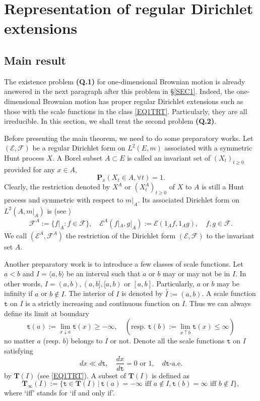 \documentclass[a4paper]{amsart}
\theoremstyle{definition}
\theoremstyle{remark}
\numberwithin{equation}{section}
\begin{document}
\section{Representation of regular Dirichlet extensions}\label{SEC2}

\subsection{Main result}\label{SEC21}
The existence problem \textbf{(Q.1)} for one-dimensional Brownian motion is already answered in the next paragraph after this problem in \S\ref{SEC1}. Indeed, the one-dimensional Brownian motion has proper regular Dirichlet extensions such as those with the scale functions in the class \eqref{EQ1TRT}. Particularly, they are all irreducible. In this section, we shall treat the second problem \textbf{(Q.2)}.

Before presenting the main theorem, we need to do some preparatory works. Let $({{\mathcal{E}}},{{\mathcal{F}}})$ be a regular Dirichlet form on $L^2(E,m)$ associated with a symmetric Hunt process $X$. A Borel subset $A\subset E$ is called an invariant set of $(X_t)_{t\geq 0}$ provided for any $x\in A$,
\[
\mathbf{P}_x(X_t\in A, \forall t)=1.
\]
Clearly, the restriction denoted by $X^A$ or $(X^A_t)_{t\geq 0}$ of $X$ to $A$ is still a Hunt process and symmetric with respect to $m|_A$. Its associated Dirichlet form on $L^2(A, m|_A)$ is (see \cite[\S2.1]{CF12})
\[
\begin{aligned}
{{\mathcal{F}}}^A:=\{f|_A: f\in {{\mathcal{F}}}\},\quad {{\mathcal{E}}}^A(f|_A,g|_A):={{\mathcal{E}}}(1_Af,1_Ag),\quad f,g\in {{\mathcal{F}}}.
\end{aligned}
\]
We call $({{\mathcal{E}}}^A, {{\mathcal{F}}}^A)$ the restriction of the Dirichlet form $({{\mathcal{E}}},{{\mathcal{F}}})$ to the invariant set $A$.

Another preparatory work is to introduce a few classes of scale functions. Let $a<b$ and $I=\langle a, b\rangle$ be an interval such that $a$ or $b$ may or may not be in $I$. In other words, $I=(a,b), (a,b], [a,b)$ or $[a,b]$. Particularly, $a$ or $b$ may be infinity if $a$ or $b\notin I$. The interior of $I$ is denoted by $\overset{\circ}{I}:=(a,b)$. A scale function ${{\mathtt{t}}}$ on $I$ is a strictly increasing and continuous function on $I$. Thus we can always define its limit at boundary
\[
	{{\mathtt{t}}}(a):=\lim_{x\downarrow a}{{\mathtt{t}}}(x)\geq -\infty,\quad (\text{resp. }{{\mathtt{t}}}(b):=\lim_{x\uparrow b} {{\mathtt{t}}}(x)\leq \infty)
\]
no matter $a$ (resp. $b$) belongs to $I$ or not. Denote all the scale functions ${{\mathtt{t}}}$ on $I$ satisfying
\[
	dx\ll d{{\mathtt{t}}},\quad  \frac{dx}{d{{\mathtt{t}}}}=0\text{ or }1, \quad d{{\mathtt{t}}}\text{-a.e.}
\]
by ${{\mathbf{T}}}(I)$ (see \eqref{EQ1TRT}). A subset of ${{\mathbf{T}}}(I)$ is defined as
\begin{equation}
{{\mathbf{T}}}_\infty(I):=\{{{\mathtt{t}}}\in {{\mathbf{T}}}(I)\, |\, {{\mathtt{t}}}(a)=-\infty\text{ iff }a\notin I, {{\mathtt{t}}}(b)=\infty\text{ iff }b\notin I\},
\end{equation}
where `iff' stands for `if and only if'.
\end{document}
